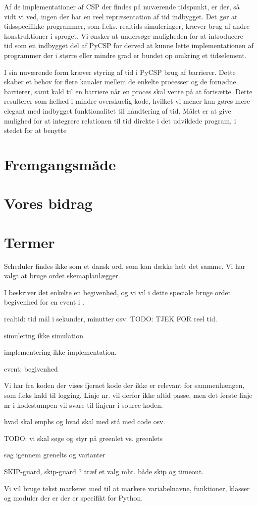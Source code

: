 Af de implementationer af CSP der findes på nuværende tidspunkt, er der, så 
vidt vi ved, ingen der har en reel repræsentation af tid indbygget. Det gør at 
tidsspecifikke programmer, som f.eks. realtids-simuleringer, kræver brug af 
andre konstruktioner i sproget.
Vi ønsker at undersøge muligheden for at introducere tid som en indbygget del 
af PyCSP for derved at kunne lette implementationen af programmer der i større 
eller mindre grad er bundet op omkring et tidselement. 


I sin nuværende form kræver styring af tid i PyCSP brug af 
barrierer. Dette skaber et 
behov for flere kanaler mellem de enkelte processer og de fornødne barrierer, 
samt kald til en barriere når en proces skal vente på at fortsætte.  Dette 
resulterer som helhed i mindre overskuelig kode, hvilket vi mener kan gøres 
mere elegant med indbygget funktionalitet til håndtering af tid. Målet er at 
give mulighed for at integrere relationen til tid direkte i det udviklede 
program, i stedet for at benytte 

\section{Fremgangsmåde}
\section{Vores bidrag}
\section{Termer}

\begin{list}{}{}
\tightlist
\item Scheduler findes ikke som et dansk ord, som kan  dække helt det samme. Vi har valgt at bruge ordet skemaplanlægger.
\item I \des beskriver det enkelte  en begivenhed, og vi vil i dette speciale bruge ordet begivenhed for en event i \des. 
\item realtid: tid mål i sekunder, minutter osv. TODO: TJEK FOR reel tid.
\item simulering ikke simulation
\item implementering ikke implementation.
\item event: begivenhed
\item Vi har fra koden der vises fjernet kode der ikke er relevant for sammenhængen, som f.eks kald til logging. Linje nr. vil derfor ikke altid passe, men det første linje nr i kodestumpen vil svare til linjenr i source koden.
\item hvad skal emphs og hvad skal med stå med code osv.
\item TODO: vi skal søge og styr på  greenlet vs. greenlets
\item søg igennem grenelts og varianter
\item SKIP-guard, skip-guard ? træf et valg mht. både skip og timeout. 
\end{list}


Vi vil bruge tekst markeret med  til at markere variabelnavne, funktioner,  klasser og moduler  der er  der er specifikt for Python.


